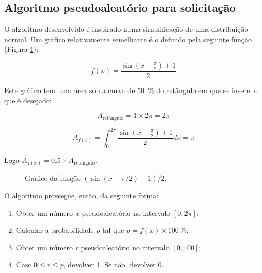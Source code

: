 \documentclass[10pt,oneside]{estiloUBI}
\begin{document}
	
	\subsection{Algoritmo pseudoaleatório para solicitação}
	\label{sssec:heap:request:alg}
	
	O algoritmo desenvolvido é inspirado numa simplificação de uma distribuição normal. Um gráfico relativamente semelhante é o definido pela seguinte função (Figura \ref{graph:heap:request:alg}):
	
	\begin{equation}
f(x) = \frac{\sin\left(x - \frac{\pi}{2}\right) + 1}{2}
	\end{equation}
	
	Este gráfico tem uma área sob a curva de \SI{50}{\percent} do retângulo em que se insere, o que é desejado:
	
	\begin{displaymath}
		A_{\textrm{retângulo}} = 1 \times 2\pi = 2\pi
	\end{displaymath}
	
	\begin{displaymath}
		A_{f(x)} = \int_{0}^{2\pi} \frac{\sin\left(x - \frac{\pi}{2}\right) + 1}{2} dx = \pi
	\end{displaymath}
	
	Logo $A_{f(x)} = 0.5 \times A_{\textrm{retângulo}}$.
	
	\begin{figure}[!htbp]
		\centering
		\caption{Gráfico da função $\left(\sin\left(x - \pi / 2\right) + 1\right) / 2$.}
		\label{graph:heap:request:alg}
	\end{figure}
	
	O algoritmo prossegue, então, da seguinte forma:
	
	\begin{enumerate}
		\item Obter um número $x$ pseudoaleatório no intervalo $[0, 2\pi]$;
		\item Calcular a probabilidade $p$ tal que $p = f(x) \times \SI{100}{\percent}$;
		\item Obter um número $r$ pseudoaleatório no intervalo $[0, 100]$;
		\item Caso $0 \leq r \leq p$, devolver 1. Se não, devolver 0.
	\end{enumerate}
\end{document}
